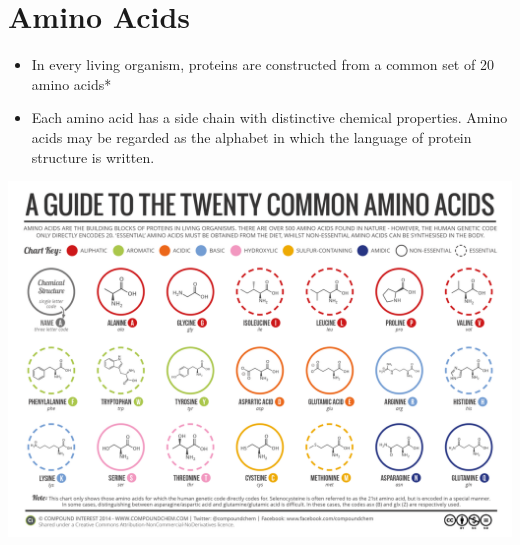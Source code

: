 \documentclass[10pt]{article}
\begin{document}
\section*{Amino Acids}
\begin{itemize}
    \item In every living organism, proteins are constructed from a common set of 20 amino acids*
    \item Each amino acid has a side chain with distinctive chemical properties.  Amino acids may be regarded as the alphabet in which the language of protein structure is written.
\end{itemize}
\begin{center}
    \includegraphics[width=\textwidth]{L1_4.png}
\end{center}
\end{document}
